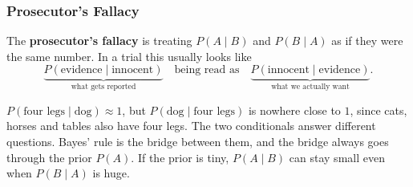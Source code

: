 \subsubsection{Prosecutor's Fallacy}

\begin{definition}\label{def:prosecutor}
The \textbf{prosecutor's fallacy} is treating $P(A \mid B)$ and $P(B \mid A)$ as if they were the same number. In a trial this usually looks like
\[
\underbrace{P(\text{evidence} \mid \text{innocent})}_{\text{what gets reported}}
\quad \text{being read as} \quad
\underbrace{P(\text{innocent} \mid \text{evidence})}_{\text{what we actually want}}.
\]
\end{definition}

\begin{intuition}
$P(\text{four legs} \mid \text{dog}) \approx 1$, but $P(\text{dog} \mid \text{four legs})$ is nowhere close to $1$, since cats, horses and tables also have four legs. The two conditionals answer different questions. Bayes' rule is the bridge between them, and the bridge always goes through the prior $P(A)$. If the prior is tiny, $P(A \mid B)$ can stay small even when $P(B \mid A)$ is huge.
\end{intuition}

